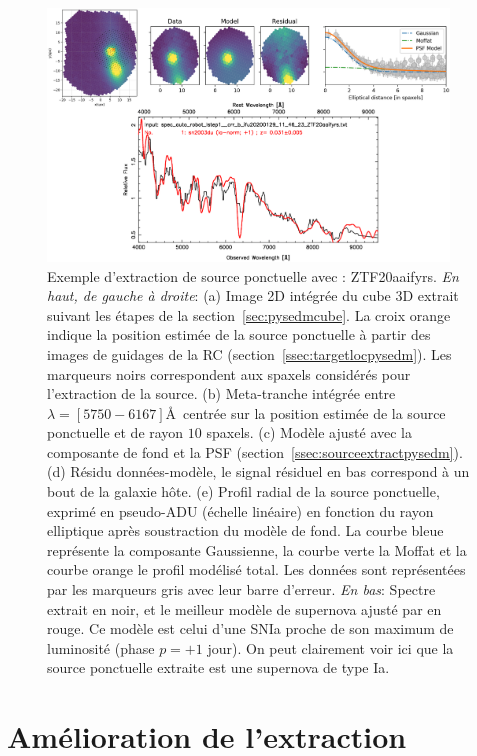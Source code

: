 \documentclass[../main/main.tex]{subfiles}
\begin{document}
\begin{figure}[ht]
  
  \includegraphics[width=0.95\textwidth]{../figures/03_sedm/pysedmoutput.png}
  \caption[Exemple d'extraction de source ponctuelle avec
  \pysedm]{Exemple d'extraction de source ponctuelle avec \pysedm:
    ZTF20aaifyrs. \textit{En haut, de gauche à droite}: (a) Image 2D intégrée
    du cube 3D extrait suivant les étapes de la section~\ref{sec:pysedmcube}. La croix orange indique la position estimée de la source
  ponctuelle à partir des images de guidages de la RC
  (section~\ref{ssec:targetlocpysedm}). Les marqueurs noirs
  correspondent aux spaxels considérés pour l'extraction de la source. (b) Meta-tranche intégrée entre
  $\lambda=[5750-6167]$\AA\, centrée sur la position estimée de la source
ponctuelle et de rayon $10$ spaxels. (c) Modèle ajusté avec la composante
de fond et la PSF (section~\ref{ssec:sourceextractpysedm}). (d)
Résidu données-modèle, le signal résiduel en bas correspond à un bout de la
galaxie hôte. (e) Profil radial de la source ponctuelle, exprimé en
pseudo-ADU (échelle linéaire) en fonction du rayon elliptique après soustraction du modèle de fond. La courbe bleue
représente la composante Gaussienne, la courbe verte la Moffat et la
courbe orange le profil modélisé total. Les données sont représentées par les
marqueurs gris avec leur barre d'erreur. \textit{En bas}: Spectre
extrait en noir, et le meilleur modèle de supernova ajusté par 
en rouge. Ce modèle est celui d'une SNIa proche de son maximum de
luminosité (phase $p=+1$ jour). On peut clairement voir ici que la source ponctuelle extraite
est une supernova de type Ia.}
  \label{fig:pysedmoutput}
\end{figure}
\section{Amélioration de l'extraction}
\end{document}
